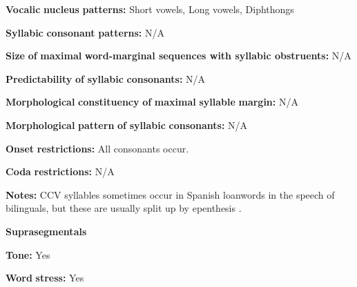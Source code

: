 \documentclass[output=paper]{langsci/langscibook}
\begin{document}
\begin{styleBody}
\textbf{Vocalic} \textbf{nucleus} \textbf{patterns:} Short vowels, Long vowels, Diphthongs
\end{styleBody}

\begin{styleBody}
\textbf{Syllabic} \textbf{consonant} \textbf{patterns:} N/A
\end{styleBody}

\begin{styleBody}
\textbf{Size} \textbf{of} \textbf{maximal} \textbf{word{}-marginal sequences with syllabic obstruents:} N/A
\end{styleBody}

\begin{styleBody}
\textbf{Predictability} \textbf{of} \textbf{syllabic} \textbf{consonants:} N/A
\end{styleBody}

\begin{styleBody}
\textbf{Morphological} \textbf{constituency} \textbf{of} \textbf{maximal} \textbf{syllable} \textbf{margin:} N/A
\end{styleBody}

\begin{styleBody}
\textbf{Morphological} \textbf{pattern} \textbf{of} \textbf{syllabic} \textbf{consonants:} N/A
\end{styleBody}

\begin{styleBody}
\textbf{Onset} \textbf{restrictions:} All consonants occur.
\end{styleBody}

\begin{styleBody}
\textbf{Coda} \textbf{restrictions:} N/A
\end{styleBody}

\begin{styleBody}
\textbf{Notes:} CCV syllables sometimes occur in Spanish loanwords in the speech of bilinguals, but these are usually split up by epenthesis \citep[76]{Olawsky2006}.
\end{styleBody}

\begin{styleBody}
\textbf{Suprasegmentals}
\end{styleBody}

\begin{styleBody}
\textbf{Tone:} Yes
\end{styleBody}

\begin{styleBody}
\textbf{Word} \textbf{stress:} Yes
\end{styleBody}
\end{document}
